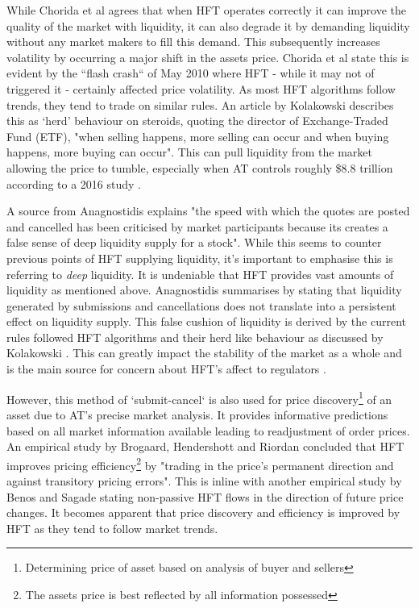 While Chorida et al \cite{REPORT:ChordiaEtAl:2013} agrees that when HFT operates correctly it can improve the quality of the market with liquidity, it can also degrade it by demanding liquidity without any market makers to fill this demand. This subsequently increases volatility by occurring a major shift in the assets price. Chorida et al state this is evident by the ``flash crash`` of May 2010 where HFT - while it may not of triggered it - certainly affected price volatility. As most HFT algorithms follow trends, they tend to trade on similar rules. An article by Kolakowski \cite{ART:Kolakowski:2018} describes this as `herd' behaviour on steroids, quoting the director of Exchange-Traded Fund (ETF), "when selling happens, more selling can occur and when buying happens, more buying can occur". This can pull liquidity from the market allowing the price to tumble, especially when AT controls roughly \$8.8 trillion according to a 2016 study \cite{ART:Kolakowski:2018}. 

A source from Anagnostidis \cite{UNPUB:Anagnostidis:2017} explains "the speed with which the quotes are posted and cancelled has been criticised by market participants because its creates a false sense of deep liquidity supply for a stock". While this seems to counter previous points of HFT supplying liquidity, it's important to emphasise this is referring to \textit{deep} liquidity. It is undeniable that HFT provides vast amounts of liquidity as mentioned above. Anagnostidis summarises by stating that liquidity generated by submissions and cancellations does not translate into a persistent effect on liquidity supply. This false cushion of liquidity is derived by the current rules followed HFT algorithms and their herd like behaviour as discussed by Kolakowski \cite{ART:Kolakowski:2018}. This can greatly impact the stability of the market as a whole and is the main source for concern about HFT's affect to regulators \cite{WEB:Kaufman:2016}.   

However, this method of `submit-cancel` is also used for price discovery\footnote{Determining price of asset based on analysis of buyer and sellers} of an asset due to AT's precise market analysis. It provides informative predictions based on all market information available leading to readjustment of order prices. An empirical study by Brogaard, Hendershott and Riordan \cite{UNPUB:Brogaard:2017} concluded that HFT improves pricing efficiency\footnote{The assets price is best reflected by all information possessed} by "trading in the price's permanent direction and against transitory pricing errors". This is inline with another empirical study by Benos and Sagade \cite{ART:BENOS:2016} stating non-passive HFT flows in the direction of future price changes. It becomes apparent that price discovery and efficiency is improved by HFT as they tend to follow market trends.  

